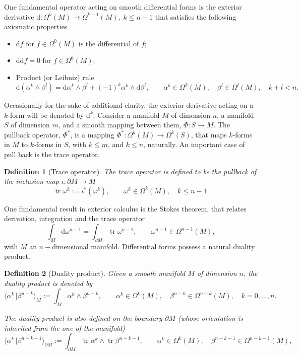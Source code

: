 \documentclass{elsarticle}
\newcommand{\revTwo}[1]{{\color{black}#1}}
\newtheorem{definition}{Definition}
\renewcommand\d{\ensuremath{\mathrm{d}}}
\DeclareMathOperator{\tr}{tr}
\newcommand{\dualpr}[3][]{\ensuremath{\langle #2 \, \vert #3 \rangle_{#1}}}
\begin{document}
One fundamental operator acting on smooth differential forms is the exterior derivative $\d:\Omega^k(M) \rightarrow \Omega^{k+1}(M), \; k\le n-1$ that satisfies the following axiomatic properties
\begin{itemize}
    \item $\d f$ for $f \in \Omega^0(M)$ is the differential of $f$;
    \item $\d\d f = 0$ for $f \in \Omega^0(M)$;
    \item Product (or Leibniz) rule
    \begin{equation}\label{eq:leibniz}
        \d (\alpha^k \wedge \beta^l) = \d\alpha^k \wedge \beta^l + (-1)^k \alpha^k \wedge \d\beta^l, \qquad \alpha^k \in \Omega^k(M), \quad \beta^l \in \Omega^l(M), \quad k+l < n.
    \end{equation}
\end{itemize}
Occasionally for the sake of additional clarity, the exterior derivative acting on a $k$-form will be denoted by $\d^k$. \revTwo{Consider a manifold $M$ of dimension $n$, a manifold $S$ of dimension $m$, and a smooth
mapping between them, $\Phi : S \rightarrow M$. The pullback operator, $\Phi^*$, is a mapping $\Phi^* : \Omega^k(M) \rightarrow \Omega^k(S)$, that
maps $k$-forms in $M$ to $k$-forms in $S$, with $k\le m$, and $k \le n$, naturally.} An important case of pull back is the trace operator.
\begin{definition}[Trace operator]
The trace operator is defined to be the pullback of the \revTwo{inclusion} map $\iota: \partial M \rightarrow M$
\begin{equation}\label{eq:trace}
    \tr \omega^k := \iota^*(\omega^k), \qquad \omega^k \in \Omega^k(M), \quad k\le n-1.  
\end{equation}
\end{definition}
One fundamental result in exterior calculus is the Stokes theorem, that relates derivation, integration and the trace operator
\begin{equation}\label{eq:Stokes}
    \int_M \d \omega^{n-1} = \int_{\partial M} \tr \omega^{n-1}, \qquad \omega^{n-1} \in \Omega^{n-1}(M),
\end{equation}
\revTwo{with $M$ an $n-$dimensional manifold.} Differential forms possess a natural duality product.
\begin{definition}[Duality product]\label{def:dualpr}
Given a smooth manifold $M$ of dimension $n$, the duality product is denoted by
\begin{equation}\label{eq:dual_pr}
    \dualpr[M]{\alpha^k}{\beta^{n-k}} := \int_M \alpha^k \wedge \beta^{n-k}, \qquad \alpha^{k} \in \Omega^{k}(M), \quad \beta^{n-k} \in \Omega^{n-k}(M), \quad k=0, \dots, n.
\end{equation}

The duality product is also defined on the boundary $\partial M$ \revTwo{(whose orientation is inherited from the one of the manifold)}
\begin{equation}
    \dualpr[\partial M]{\alpha^k}{\beta^{n-k-1}} := \int_{\partial M} \tr \alpha^k \wedge \tr \beta^{n-k-1}, \qquad \alpha^k \in \Omega^{k}(M), \quad  \beta^{n-k-1} \in \Omega^{n-k-1}(M), 
\end{equation}
\end{definition}
\end{document}
